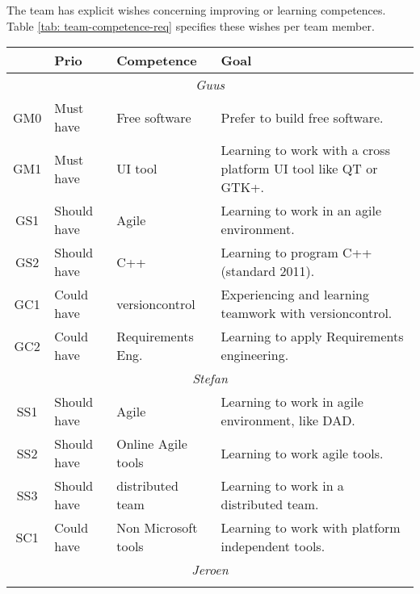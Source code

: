 
The team has explicit wishes concerning improving or learning competences. Table
\ref{tab: team-competence-req} specifies these wishes per team member.

\begin{center}
    \begin{tabular}{cllp{17em}}
        \hline
        & {\bf Prio} & {\bf Competence}    & {\bf Goal}\\
        \hline
        \multicolumn{4}{c}{\sf\emph{Guus}}\\
        \hline
		GM0 & Must have    & Free software & Prefer to build free software.\\
        GM1 & Must have    & UI tool       & Learning to work with a cross platform UI tool like QT or GTK+.\\
        GS1 & Should have  & Agile		   & Learning to work in an agile environment.\\
        GS2 & Should have  & C++		   & Learning to program C++ (standard 2011).\\
	GC1 & Could have   & versioncontrol	   & Experiencing and learning teamwork with versioncontrol.\\
        GC2 & Could have   & Requirements Eng.   & Learning to apply Requirements engineering.\\
        \hline
        \multicolumn{4}{c}{\sf\emph{Stefan}}\\
        \hline
        SS1 & Should have  & Agile		   & Learning to work in agile environment, like DAD.\\
        SS2 & Should have  & Online Agile tools  & Learning to work agile tools.\\
        SS3 & Should have  & distributed team    & Learning to work in a distributed team.\\
        SC1 & Could have   & Non Microsoft tools & Learning to work with platform independent tools.\\
        \hline
        \multicolumn{4}{c}{\sf\emph{Jeroen}}\\
        \hline
                     &                     & \\
        \hline
    \end{tabular}
    \label{tab:team-competence-req}
\end{center}
